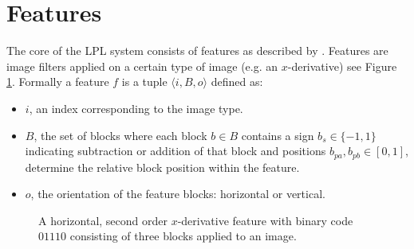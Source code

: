 \documentclass[a4paper,11pt]{article}
\begin{document}
\section{Features} \label{sec:feat}
The core of the LPL system consists of features as described by
\cite{dlagnekov_thesis, zhang,naturaltext}. Features are image filters applied
on a certain type of image (e.g. an $x$-derivative) see Figure \ref{fig:feature}.
Formally a feature $f$ is a tuple $\langle i, B, o \rangle$ defined as:
\begin{itemize}
	\item{$i$, an index corresponding to the image type.}
	\item{$B$, the set of blocks where each block $b \in B$ contains a sign
	$b_s \in \{-1,1\}$ indicating subtraction or addition of that block and
	positions $b_{pa},b_{pb} \in [0,1]$, determine the relative block position
	within the feature.}
	\item{$o$, the orientation of the feature blocks: horizontal or vertical.}
\end{itemize}
\begin{figure}[!ht]
\centering
{}
\caption{A horizontal, second order $x$-derivative feature with binary code
$01110$ consisting of three blocks applied to an image.}
\label{fig:feature}
\end{figure}
\end{document}
